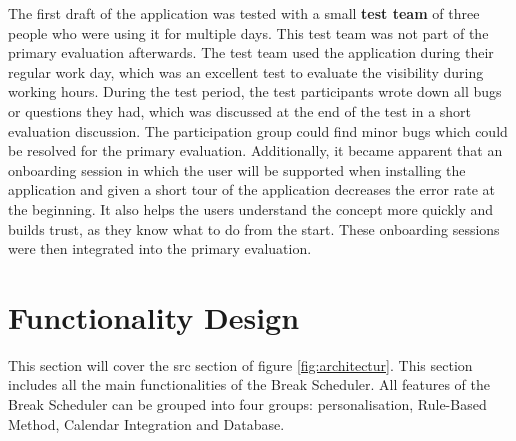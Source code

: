 \documentclass{hasel_thesis}
\begin{document}
The first draft of the application was tested with a small \textbf{test team} of three people who were using it for multiple days. This test team was not part of the primary evaluation afterwards. The test team used the application during their regular work day, which was an excellent test to evaluate the visibility during working hours. During the test period, the test participants wrote down all bugs or questions they had, which was discussed at the end of the test in a short evaluation discussion. The participation group could find minor bugs which could be resolved for the primary evaluation. Additionally, it became apparent that an onboarding session in which the user will be supported when installing the application and given a short tour of the application decreases the error rate at the beginning. It also helps the users understand the concept more quickly and builds trust, as they know what to do from the start. These onboarding sessions were then integrated into the primary evaluation.


\section{Functionality Design}

This section will cover the src section of figure \ref{fig:architectur}. This section includes all the main functionalities of the Break Scheduler. All features of the Break Scheduler can be grouped into four groups: personalisation, Rule-Based Method, Calendar Integration and Database.
\end{document}
